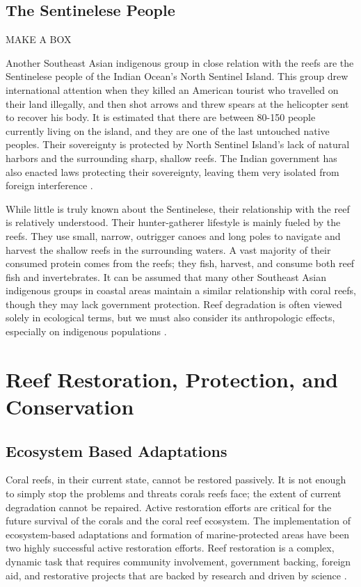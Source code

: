 \documentclass{book}\usepackage{knitr}
\begin{document}
\begin{knitrout}
\begin{kframe}
\subsection{The Sentinelese People}

MAKE A BOX

Another Southeast Asian indigenous group in close relation with the reefs are the Sentinelese people of the Indian Ocean’s North Sentinel Island. This group drew international attention when they killed an American tourist who travelled on their land illegally, and then shot arrows and threw spears at the helicopter sent to recover his body. It is estimated that there are between 80-150 people currently living on the island, and they are one of the last untouched native peoples. Their sovereignty is protected by North Sentinel Island’s lack of natural harbors and the surrounding sharp, shallow reefs. The Indian government has also enacted laws protecting their sovereignty, leaving them very isolated from foreign interference \citep{Smith}.

While little is truly known about the Sentinelese, their relationship with the reef is relatively understood. Their hunter-gatherer lifestyle is mainly fueled by the reefs. They use small, narrow, outrigger canoes and long poles to navigate and harvest the shallow reefs in the surrounding waters. A vast majority of their consumed protein comes from the reefs; they fish, harvest, and consume both reef fish and invertebrates. It can be assumed that many other Southeast Asian indigenous groups in coastal areas maintain a similar relationship with coral reefs, though they may lack government protection. Reef degradation is often viewed solely in ecological terms, but we must also consider its anthropologic effects, especially on indigenous populations \citep{Smith}.

\section{Reef Restoration, Protection, and Conservation}

\subsection{Ecosystem Based Adaptations}

Coral reefs, in their current state, cannot be restored passively. It is not enough to simply stop the problems and threats corals reefs face; the extent of current degradation cannot be repaired. Active restoration efforts are critical for the future survival of the corals and the coral reef ecosystem. The implementation of ecosystem-based adaptations and formation of marine-protected areas have been two highly successful active restoration efforts. Reef restoration is a complex, dynamic task that requires community involvement, government backing, foreign aid, and restorative projects that are backed by research and driven by science \citep{14551496520201201}. 


\end{kframe}
\end{knitrout}
\end{document}
